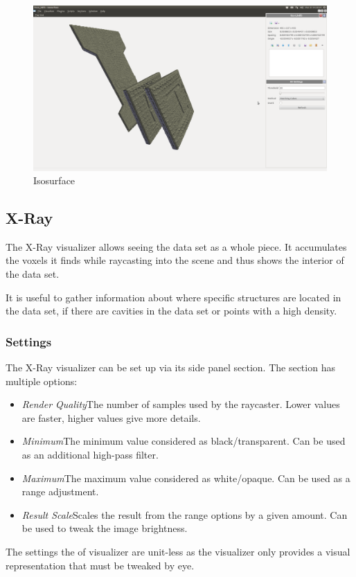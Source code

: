 \begin{figure}[h!]
	\caption{Isosurface}
	\centering
	\includegraphics[width=1.0\textwidth]{img/isosurface.png}
\end{figure}

\newpage
\subsection{X-Ray}

The X-Ray visualizer allows seeing the data set as a whole piece. It accumulates
the voxels it finds while raycasting into the scene and thus shows the interior of
the data set.

It is useful to gather information about where specific structures are located in
the data set, if there are cavities in the data set or points with a high density.

\subsubsection{Settings}
The X-Ray visualizer can be set up via its side panel section.
The section has multiple options:
\begin{itemize}
	\item{\emph{Render Quality}\newline The number of samples used by the raycaster.
		Lower values are faster, higher values give more details.}
	\item{\emph{Minimum}\newline The minimum value considered as black/transparent.
		Can be used as an additional high-pass filter.}	
	\item{\emph{Maximum}\newline The maximum value considered as white/opaque.
			Can be used as a range adjustment.}
	\item{\emph{Result Scale}\newline Scales the result from the range options by
		a given amount. Can be used to tweak the image brightness.}
\end{itemize}
The settings the of visualizer are unit-less as the visualizer only provides a
visual representation that must be tweaked by eye.


